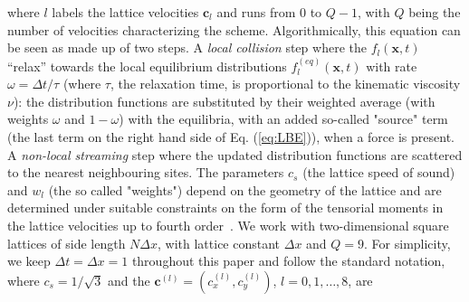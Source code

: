 where $l$ labels the lattice velocities $\mathbf{c}_l$ and runs from $0$ to $Q-1$, with $Q$ being the number
of velocities characterizing the scheme.
Algorithmically, this equation can be seen as made up of two steps. A \textit{local collision}
step where the $f_l(\mathbf{x},t)$ ``relax'' towards the local equilibrium distributions
$f^{(eq)}_l(\mathbf{x},t)$ with rate  
$\omega = \Delta t/\tau$ (where $\tau$, the relaxation time, is proportional to the kinematic viscosity $\nu$): the distribution functions are substituted by their weighted average 
(with weights $\omega$ and $1-\omega$) 
with the equilibria, with an added so-called "source" term (the last term on the right hand side of Eq. (\ref{eq:LBE})), when a force is present. A \textit{non-local streaming} step where the updated distribution functions are scattered to the nearest neighbouring sites. 
The parameters $c_s$ (the lattice speed of sound) and $w_l$ (the 
so called "weights")
depend on the geometry of the lattice and are determined under suitable constraints on 
the form of the tensorial moments in the lattice velocities up to fourth order~\cite{wolf-gladrow}.
We work with two-dimensional square lattices of side length $N\Delta x$, with lattice constant $\Delta x$ and $Q=9$.
For simplicity, we keep $\Delta t=\Delta x=1$ throughout this paper and follow the standard notation, where $c_s = 1/\sqrt{3}$ and the $\mathbf{c}^{(l)} = (c^{(l)}_x,c^{(l)}_y)$, $l=0,1,\dots,8$, are~\cite{qian-dhumieres-lallemand,shan_yuan_chen_2006} 

